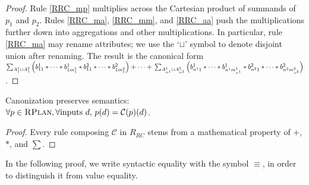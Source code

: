 \begin{proof}
Rule \ref{RRC_mp} multiplies across the Cartesian product of summands of $p_1$ and $p_2$.
Rules \ref{RRC_ma}, \ref{RRC_mm}, and \ref{RRC_aa} push the multiplications further down into aggregations and other multiplications.
In particular, rule \ref{RRC_ma} may rename attributes; we use the `$\sqcup$' symbol to denote disjoint union after renaming.
The result is the canonical form \\
$\sum_{A^1_{1} \sqcup A^2_{1}} \left(b^1_{11} * \dots * b^1_{1m^1_1} * b^2_{11} * \dots * b^2_{1m^2_1}\right) + \dots + \\
\sum_{A^1_{n^1} \sqcup A^2_{n^2}} \left(b^1_{n^11} * \dots * b^1_{n^1m^1_{n^1}} * b^2_{n^21} * \dots * b^2_{n^2m^2_{n^2}}\right)$.
\end{proof}


\begin{lemma}\label{lCanonPreservesSemantics}
Canonization preserves semantics: \\
$\forall p \in \textsc{RPlan}{}, \forall \text{inputs } d,\, p(d) = \mathcal{C}(p)(d)$.
\end{lemma}
\begin{proof}
Every rule composing $\mathcal{C}$ in $R_{RC}$ stems from a mathematical property of $+$, $*$, and $\sum$.
\end{proof}

In the following proof, we write syntactic equality with the symbol $\equiv$, in order to distinguish it from value equality.


